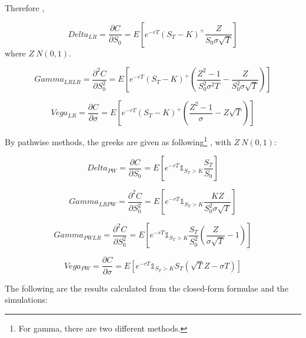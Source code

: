 \documentclass[11pt,a4paper,fleqn,draft]{article}
\begin{document}
Therefore \cite{lectures},

$$Delta_{LR}=\frac{\partial C}{\partial S_0}=E[e^{-rT}(S_T-K)^+\frac{Z}{S_0\sigma\sqrt{T}}]$$
where $Z~N(0,1).$

$$Gamma_{LR LR} = \frac{\partial^2 C}{\partial  S_0^2 }=E[e^{-rT}(S_T-K)^+(\frac{Z^2-1}{S_0^2\sigma^2 T } - \frac{Z}{S_0^2 \sigma \sqrt{T}})]$$

$$Vega_{LR} = \frac{\partial C}{\partial \sigma}=E[e^{-rT}(S_T-K)^+\left(\frac{Z^2-1}{\sigma}-Z\sqrt{T}\right)]$$

By pathwise methods, the greeks are given as following\footnote{For gamma, there are two different methods.} \cite{lectures}, with $Z~N(0,1)$:

$$Delta_{PW}=\frac{\partial C}{\partial S_0}=E[e^{-rT}\mathds{1}_{S_T>K}\frac{S_T}{S_0}]$$

$$Gamma_{LRPW} = \frac{\partial^2 C}{\partial  S_0^2 }=E[e^{-rT}\mathds{1}_{S_T>K}\frac{KZ}{S_0^2\sigma\sqrt{T}}]$$

$$Gamma_{PWLR} = \frac{\partial^2 C}{\partial  S_0^2 }=E[e^{-rT}\mathds{1}_{S_T>K}\frac{S_T}{S_0^2}\left(\frac{Z}{\sigma\sqrt{T}}-1\right)]$$

$$Vega_{PW} = \frac{\partial C}{\partial \sigma}=E[e^{-rT}\mathds{1}_{S_T>K}S_T(\sqrt{T}Z-\sigma T)]$$

The following are the results calculated from the closed-form formulae and the simulations:\\
\end{document}
